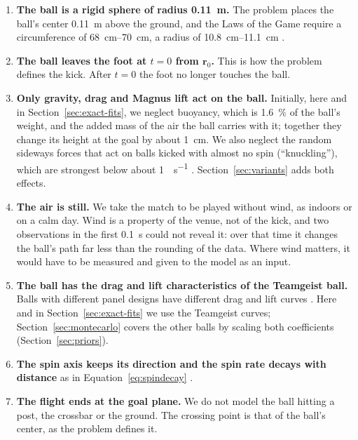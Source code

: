 \documentclass[10pt,a4paper]{article}
\begin{document}
\begin{enumerate}
  \item \textbf{The ball is a rigid sphere of radius \SI{0.11}{\metre}.}
    The problem places the ball's center \SI{0.11}{\metre} above the ground,
    and the Laws of the Game require a circumference of
    \SIrange{68}{70}{\centi\metre}, a radius of
    \SIrange{10.8}{11.1}{\centi\metre} \citep{ifab2025}.
  \item \textbf{The ball leaves the foot at $t = 0$ from $\bm{r}_0$.} This is
    how the problem defines the kick. After $t = 0$ the foot no longer touches
    the ball.
  \item \textbf{Only gravity, drag and Magnus lift act on the ball.} Initially, here and
    in Section~\ref{sec:exact-fits}, we neglect buoyancy, which is
    \SI{1.6}{\percent} of the ball's weight, and the added mass of the air the
    ball carries with it; together they change its height at the goal by about
    \SI{1}{\centi\metre}. We also neglect the random sideways forces that act
    on balls kicked with almost no spin (``knuckling''), which are strongest
    below about \SI{1}{\rev\per\second} \citep{mizota2013}.
    Section~\ref{sec:variants} adds both effects.
  \item \textbf{The air is still.} We take the match to be played without
    wind, as indoors or on a calm day. Wind is a property of the venue, not
    of the kick, and two observations in the first \SI{0.1}{\second} could
    not reveal it: over that time it changes the ball's path far less than
    the rounding of the data. Where wind matters, it would have to be
    measured and given to the model as an input.
  \item \textbf{The ball has the drag and lift characteristics of the Teamgeist ball.} Balls with
    different panel designs have different drag and lift curves
    \citep{kiratidis2018}. Here and in Section~\ref{sec:exact-fits} we use the
    Teamgeist curves; Section~\ref{sec:montecarlo} covers the other balls by
    scaling both coefficients (Section~\ref{sec:priors}).
  \item \textbf{The spin axis keeps its direction and the spin rate decays
    with distance} as in Equation~\eqref{eq:spindecay} \citep{tsukada2008}.
  \item \textbf{The flight ends at the goal plane.} We do not model the ball
    hitting a post, the crossbar or the ground. The crossing point is that of
    the ball's center, as the problem defines it.
\end{enumerate}
\end{document}
